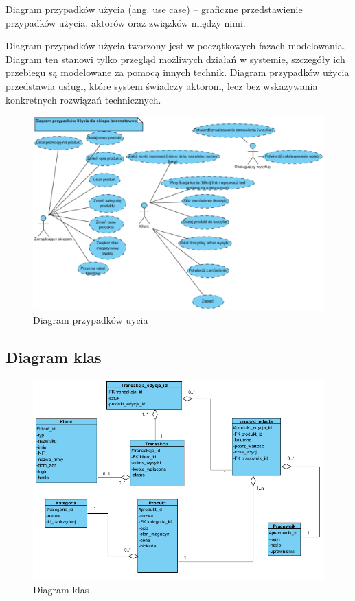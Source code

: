 Diagram przypadków użycia (ang. use case) – graficzne przedstawienie przypadków użycia, aktorów oraz związków między nimi.

Diagram przypadków użycia tworzony jest w początkowych fazach modelowania. Diagram ten stanowi tylko przegląd możliwych działań w systemie, szczegóły ich przebiegu są modelowane za pomocą innych technik. Diagram przypadków użycia przedstawia usługi, które system świadczy aktorom, lecz bez wskazywania konkretnych rozwiązań technicznych.

\begin{figure} [H]
	\centering
	\includegraphics[width=15 cm] {fig/use_case_diagram}
	\caption{Diagram przypadków uycia}
	\label{fig:use_case_diagram}
\end{figure}
\subsection{Diagram klas}
\begin{figure}[H]
	\centering
	\includegraphics[width=15 cm] {fig/klasy}
	\caption{Diagram klas}
	\label{fig:diagram klas}
\end{figure}
